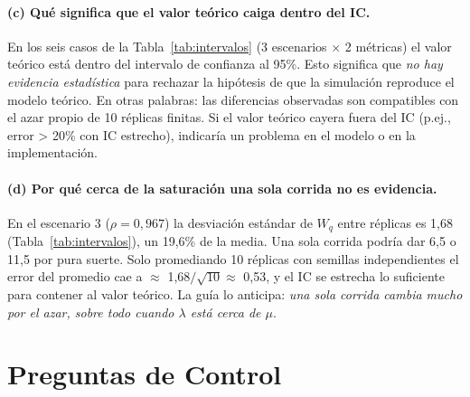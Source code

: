 \documentclass[11pt,a4paper]{article}
\begin{document}
\paragraph{(c) Qué significa que el valor teórico caiga dentro del IC.}
En los seis casos de la Tabla~\ref{tab:intervalos} (3 escenarios $\times$ 2 métricas)
el valor teórico está dentro del intervalo de confianza al 95\%. Esto significa
que \emph{no hay evidencia estadística} para rechazar la hipótesis de que la
simulación reproduce el modelo teórico. En otras palabras: las diferencias
observadas son compatibles con el azar propio de 10 réplicas finitas. Si el
valor teórico cayera fuera del IC (p.ej., error > 20\% con IC estrecho),
indicaría un problema en el modelo o en la implementación.

\paragraph{(d) Por qué cerca de la saturación una sola corrida no es evidencia.}
En el escenario 3 ($\rho=0,967$) la desviación estándar de $W_q$ entre réplicas
es 1,68 (Tabla~\ref{tab:intervalos}), un 19,6\% de la media. Una sola corrida
podría dar 6,5 o 11,5 por pura suerte. Solo promediando 10 réplicas con
semillas independientes el error del promedio cae a $\approx$ 1,68$/\sqrt{10} \approx$
0,53, y el IC se estrecha lo suficiente para contener al valor teórico. La
guía lo anticipa: \emph{una sola corrida cambia mucho por el azar, sobre todo
cuando $\lambda$ está cerca de $\mu$}.

\section{Preguntas de Control}
\end{document}
